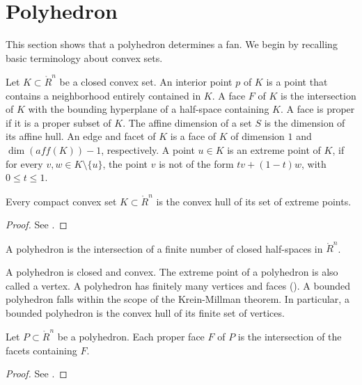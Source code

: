 \section{Polyhedron}

This section shows that a polyhedron determines a fan.  We begin by recalling basic terminology about convex sets.

\begin{definition} Let $K\subset\ring{R}^n$ be a closed convex set.   An interior point $p$ of $K$ is a point that contains a neighborhood entirely contained in $K$.  A face $F$ of $K$ is the intersection of $K$ with the bounding hyperplane of a half-space containing $K$.  A face is proper if it is a proper subset of $K$.  The affine dimension of a set $S$ is the dimension of its affine hull.  An edge and facet of $K$ is a face of $K$ of dimension $1$ and $\dim(aff(K))-1$, respectively.  A point $u\in K$ is an extreme point of $K$, if for every $v,w\in K\setminus\{u\}$, the point $v$ is not of the form $t v + (1-t) w$, with $0\le t\le 1$.
\end{definition}

\begin{lemma} Every compact convex set $K\subset\ring{R}^n$ is the convex hull of its set of extreme points.
\end{lemma}

\begin{proof}  See \cite[Theorem~3.3]{barvinok:2002}.
\end{proof}

\begin{definition}[polyhedron]  A polyhedron is the intersection of
a finite number of closed half-spaces in $\ring{R}^n$.
\end{definition}

A polyhedron is closed and convex.  The extreme point of a polyhedron is also called a vertex.  A polyhedron has finitely many vertices and faces (\cite{barvinok:2002}).  A bounded polyhedron falls within the scope of the Krein-Millman theorem.  In particular, a bounded polyhedron is the convex hull of its finite set of vertices.

\begin{lemma}  Let $P\subset\ring{R}^n$ be a polyhedron.  Each proper face $F$ of $P$ is the intersection of the facets containing $F$.
\end{lemma}

\begin{proof} See \cite{webster:1994}.
\end{proof}


